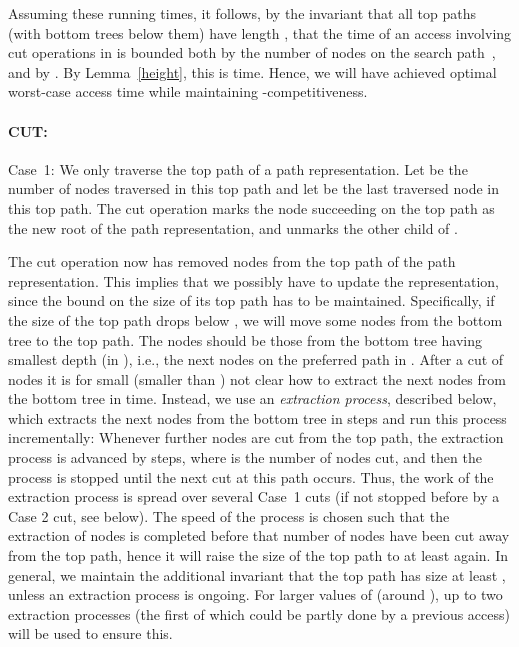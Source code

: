 \documentclass[letterpaper,11pt]{article}
\newcommand{\toppath}{top path}
\newcommand{\bottomtree}{bottom tree}
\begin{document}
Assuming these running times, it follows, by the invariant that all
\toppath{}s (with \bottomtree{}s below them) have length , that the time of an access involving  cut operations in  is
bounded both by the number of nodes on the search path~, and by . By Lemma~\ref{height}, this is 
time. Hence, we will have achieved optimal worst-case access time while
maintaining -competitiveness.

\paragraph{CUT:} Case~1: We only traverse the \toppath{} of a path
representation. Let  be the number of nodes traversed in this \toppath{}
and let  be the last traversed node in this \toppath{}. The cut
operation marks the node succeeding  on the \toppath{} as the new root of the
path representation, and unmarks the other child of .

The cut operation now has removed  nodes from the \toppath{} of the path
representation. This implies that we possibly have to update the
representation, since the  bound on the size of its
\toppath{} has to be maintained. Specifically, if the size of the top path
drops below , we will move some nodes from the \bottomtree{}
to the \toppath{}. The nodes should be those from the \bottomtree{} having
smallest depth (in ), i.e., the next nodes on the preferred path in
. After a cut of  nodes it is for small  (smaller than ) not clear how to extract the next  nodes from the \bottomtree{} in
 time. Instead, we use an \emph{extraction process}, described below,
which extracts the next  nodes from the \bottomtree{} in
 steps and run this process incrementally: Whenever further
nodes are cut from the \toppath{}, the extraction process is advanced by
 steps, where  is the number of nodes cut, and then the
process is stopped until the next cut at this path occurs. Thus, the work
of the extraction process is spread over several Case~1 cuts (if not
stopped before by a Case 2 cut, see below). The speed of the process is
chosen such that the extraction of  nodes is completed before
that number of nodes have been cut away from the \toppath, hence it will
raise the size of the \toppath{} to at least  again. In
general, we maintain the additional invariant that the \toppath{} has size
at least , unless an extraction process is ongoing. For
larger values of  (around ), up to two extraction processes
(the first of which could be partly done by a previous access) will be used
to ensure this.
\end{document}

